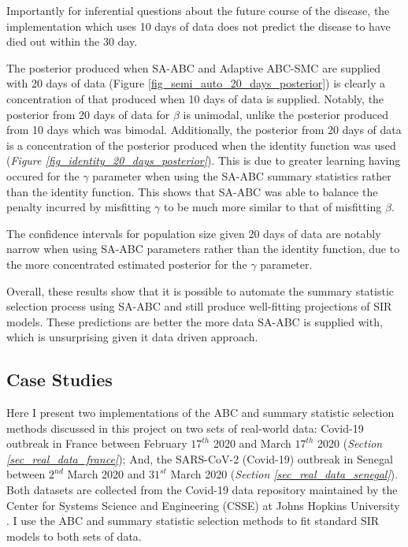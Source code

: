 \documentclass[11pt,a4paper]{article}
\theoremstyle{break}
\begin{document}
  \par Importantly for inferential questions about the future course of the disease, the implementation which uses 10 days of data does not predict the disease to have died out within the 30 day.

  \par The posterior produced when SA-ABC and Adaptive ABC-SMC are supplied with 20 days of data (Figure \ref{fig_semi_auto_20_days_posterior}) is clearly a concentration of that produced when 10 days of data is supplied. Notably, the posterior from 20 days of data for $\beta$ is unimodal, unlike the posterior produced from 10 days which was bimodal. Additionally, the posterior from 20 days of data is a concentration of the posterior produced when the identity function was used (\textit{Figure \ref{fig_identity_20_days_posterior}}). This is due to greater learning having occured for the $\gamma$ parameter when using the SA-ABC summary statistics rather than the identity function. This shows that SA-ABC was able to balance the penalty incurred by misfitting $\gamma$ to be much more similar to that of misfitting $\beta$.

  \par The confidence intervals for population size given 20 days of data are notably narrow when using SA-ABC parameters rather than the identity function, due to the more concentrated estimated posterior for the $\gamma$ parameter.

  \par Overall, these results show that it is possible to automate the summary statistic selection process using SA-ABC and still produce well-fitting projections of SIR models. These predictions are better the more data SA-ABC is supplied with, which is unsurprising given it data driven approach.

\subsection{Case Studies}\label{sec_case_studies}

  Here I present two implementations of the ABC and summary statistic selection methods discussed in this project on two sets of real-world data: Covid-19 outbreak in France between February $17^{th}$ 2020 and March $17^{th}$ 2020 (\textit{Section \ref{sec_real_data_france}}); And, the SARS-CoV-2 (Covid-19) outbreak in Senegal between $2^{nd}$ March 2020 and $31^{st}$ March 2020 (\textit{Section \ref{sec_real_data_senegal}}). Both datasets are collected from the Covid-19 data repository maintained by the Center for Systems Science and Engineering (CSSE) at Johns Hopkins University \cite{covid_data_repo}. I use the ABC and summary statistic selection methods to fit standard SIR models to both sets of data.
\end{document}
